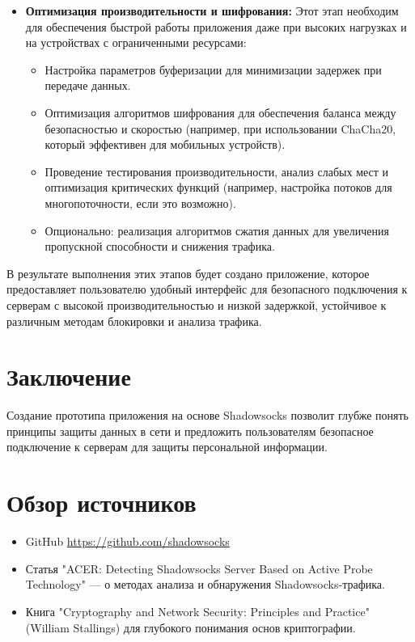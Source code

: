 \documentclass[a4paper,12pt]{article}
\begin{document}
\begin{itemize}
    \item \textbf{Оптимизация производительности и шифрования:}  
    Этот этап необходим для обеспечения быстрой работы приложения даже при высоких нагрузках и на устройствах с ограниченными ресурсами:
    \begin{itemize}
        \item Настройка параметров буферизации для минимизации задержек при передаче данных.
        \item Оптимизация алгоритмов шифрования для обеспечения баланса между безопасностью и скоростью (например, при использовании ChaCha20, который эффективен для мобильных устройств).
        \item Проведение тестирования производительности, анализ слабых мест и оптимизация критических функций (например, настройка потоков для многопоточности, если это возможно).
        \item Опционально: реализация алгоритмов сжатия данных для увеличения пропускной способности и снижения трафика.
    \end{itemize}
\end{itemize}

В результате выполнения этих этапов будет создано приложение, которое предоставляет пользователю удобный интерфейс для безопасного подключения к серверам с высокой производительностью и низкой задержкой, устойчивое к различным методам блокировки и анализа трафика.


\section*{Заключение}

Создание прототипа приложения на основе Shadowsocks позволит глубже понять принципы защиты данных в сети и предложить пользователям безопасное подключение к серверам для защиты персональной информации.

\newpage

\section*{Обзор источников}

\begin{itemize}
    \item GitHub \url{https://github.com/shadowsocks}
    \item Статья "ACER: Detecting Shadowsocks Server Based on Active Probe Technology" --- о методах анализа и обнаружения Shadowsocks-трафика.
    \item Книга "Cryptography and Network Security: Principles and Practice" (William Stallings) для глубокого понимания основ криптографии.
\end{itemize}
\end{document}
